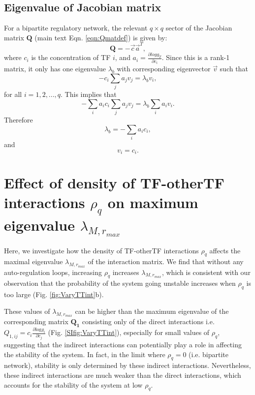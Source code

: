 \documentclass[10pt]{article}
\begin{document}
\subsection{Eigenvalue of Jacobian matrix}
For a bipartite regulatory network, the relevant $q \times q$ sector of the Jacobian matrix $\mathbf{Q}$ (main text Eqn. \ref{eqn:Qmatdef}) is given by:
\begin{equation}
    \mathbf{Q} = -\vec{c} \vec{a}^T,
\end{equation}
where $c_i$ is the concentration of TF $i$, and $a_i = \frac{\partial log g_T}{\partial c_i}$. Since this is a rank-1 matrix, it only has one eigenvalue $\lambda_b$ with corresponding eigenvector $\vec{v}$ such that
\begin{equation}
    -c_i \sum_j a_j v_j = \lambda_b v_i,
\end{equation}
for all $i = 1,2,...,q$. This implies that
\begin{equation}
     -\sum_i a_i c_i \sum_j a_j v_j = \lambda_b \sum_i a_i v_i.
\end{equation}
Therefore
\begin{equation}
     \lambda_b = -\sum_i a_i c_i,
\end{equation}
and
\begin{equation}
     v_i = c_i.
\end{equation}


\section{Effect of density of TF-otherTF interactions $\rho_q$ on maximum eigenvalue $\lambda_{M,r_{max}}$}
\label{sec:rhoqEffect}

Here, we investigate how the density of TF-otherTF interactions $\rho_q$ affects the maximal eigenvalue $\lambda_{M,r_{max}}$ of the interaction matrix. We find that without any auto-regulation loops, increasing $\rho_q$ increases $\lambda_{M,r_{max}}$, which is consistent with our observation that the probability of the system going unstable increases when $\rho_q$ is too large (Fig. \ref{fig:VaryTTint}b). 

These values of $\lambda_{M,r_{max}}$ can be higher than the maximum eigenvalue of the corresponding matrix $\mathbf{Q_1}$ consisting only of the direct interactions i.e. $Q_{1,ij} = c_i \frac{\partial \text{log}g_i}{\partial c_j}$ (Fig. \ref{SIfig:VaryTTint}), especially for small values of $\rho_q$, suggesting that the indirect interactions can potentially play a role in affecting the stability of the system. In fact, in the limit where $\rho_q = 0$ (i.e. bipartite network), stability is only determined by these indirect interactions. Nevertheless, these indirect interactions are much weaker than the direct interactions, which accounts for the stability of the system at low $\rho_q$.
\end{document}
